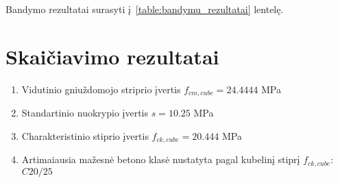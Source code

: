 \documentclass[a4paper, 12pt]{article}
\begin{document}
Bandymo rezultatai surasyti į~\ref{table:bandymu_rezultatai} lentelę.

\section{Skaičiavimo rezultatai}
\begin{enumerate}
	\item \hspace{\parindent}Vidutinio gniuždomojo striprio įvertis $ f_{cm,cube} =  24.4444 $ MPa %
	      
	\item Standartinio nuokrypio įvertis $ s = 10.25 $ MPa %
	      
	\item  Charakteristinio stiprio įvertis $ f_{ck,cube} = 20.444 $ MPa %
	      
	\item Artimaiausia mažesnė betono klasė nustatyta pagal kubelinį stiprį $f_{ck,cube}$: $ C20/25 $
\end{enumerate}

\end{document}
